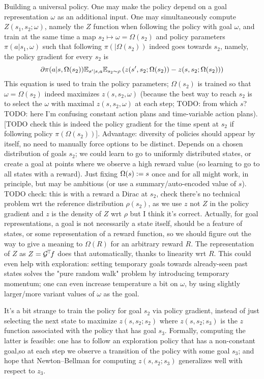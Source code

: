 \documentclass[11pt,a4paper]{article}
\newcommand{\green}{\mathcal{G}}
\begin{document}
Building a universal policy. One may make the policy depend on a goal
representation $\omega$ as an additional input. One may simultaneously
compute $Z(s_1,s_2;\omega)$, namely the $Z$ function when following the
policy with goal $\omega$, and train at the same time a map $s_2\mapsto \omega=\Omega(s_2)$ and
policy parameters $\pi(a|s_1,\omega)$ such that following
$\pi(|\Omega(s_2))$ indeed goes towards $s_2$, namely, the policy
gradient for every $s_2$ is
\begin{equation}
\partial \pi(a|s,\Omega(s_2))\mathbb{E}_{s'|s,a} \mathbb{E}_{s_2\sim \rho} \,
(z(s',s_2;\Omega(s_2))-z(s,s_2;\Omega(s_2)))
\end{equation}
This equation is used to train the policy parameters; $\Omega(s_2)$ is
trained so that $\omega=\Omega(s_2)$ indeed maximizes $z(s,s_2,\omega)$
(because the best way to reach $s_2$ is to select the $\omega$ with
maximal $z(s,s_2,\omega)$ at each step; TODO: from which $s$? TODO: here
I'm confusing constant action plans and time-variable action plans).
[TODO check this is indeed the policy gradient for the time spent at
$s_2$ if following policy $\pi(\Omega(s_2))$]. Advantage: diversity of
policies should appear by itself, no need to manually force options to be
distinct. Depends on a chosen distribution of goals $s_2$; we could learn
to go to uniformly distributed states, or create a goal at points where
we observe a high reward value (so learning to go to all states with a
reward). Just fixing $\Omega(s)\mathrel{\mathop{:}}= s$ once and for all might work, in
principle, but may be ambitious (or use a summary/auto-encoded value of
$s$). TODO check:
this is with a reward a Dirac at $s_2$, check there's no technical
problem wrt the reference distribution $\rho(s_2)$, as we use $z$ not $Z$
in the policy gradient and $z$ is the density of $Z$ wrt $\rho$ but I
think it's correct. Actually, for goal representations, a goal is not
necessarily a state itself, should be a feature of states, or some
representation of a reward function, so we should figure out the way to
give a meaning to $\Omega(R)$ for an arbitrary reward $R$. The
representation of $Z$ as $Z=\transp{\green}f$ does that automatically,
thanks to linearity wrt $R$. This could even help with exploration:
setting temporary goals towards already-seen past states solves the "pure
random walk" problem by introducing temporary momentum; one can even
increase temperature a bit on $\omega$, by using slightly larger/more
variant values of $\omega$ as the goal.

It's a bit strange to train the policy for goal $s_2$ via policy gradient,
instead of just selecting the next state to maximize
$z(s,s_2;s_2)$ where $z(s,s_2;s_3)$ is the $z$ function associated with
the policy that has goal $s_3$. Formally, computing the latter is
feasible: one has to follow an exploration policy that has a non-constant
goal,so at each step we observe a transition of the policy with some goal
$s_3$; and hope that Newton--Bellman for computing $z(s,s_2;s_3)$
generalizes well with respect to $z_3$.
\end{document}
